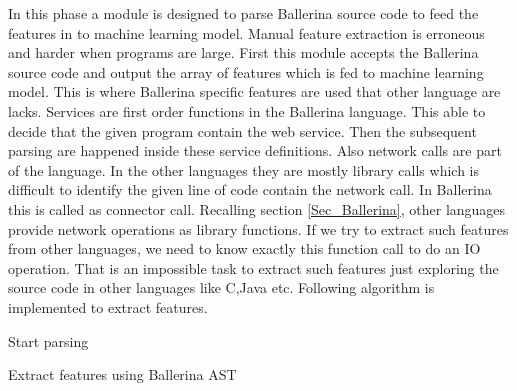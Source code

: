 In this phase a module is designed to parse Ballerina source code to feed the features in to machine learning model. Manual feature extraction is erroneous and harder when programs are large. First this module accepts the Ballerina source code and output the array of features which is fed to machine learning model. This is where Ballerina specific features are used that other language are lacks. 
Services are first order functions in the Ballerina language. This able to decide that the given program contain the web service. Then the subsequent parsing are happened inside these service definitions. Also network calls are part of the language. In the other languages they are mostly library calls which is difficult to identify the given line of code contain the network call. In Ballerina this is called as connector call. Recalling section \ref{Sec_Ballerina}, other languages provide network operations as library functions. If we try to extract such features from other languages, we need to know exactly this function call to do an IO operation. That is an impossible task to extract such features just exploring the source code in other languages like C,Java etc. Following algorithm is implemented to extract features.


\begin{algorithm}
	\SetAlgoLined
	Start parsing\;
	
	
	\caption{Extract features using Ballerina AST}
\end{algorithm}

